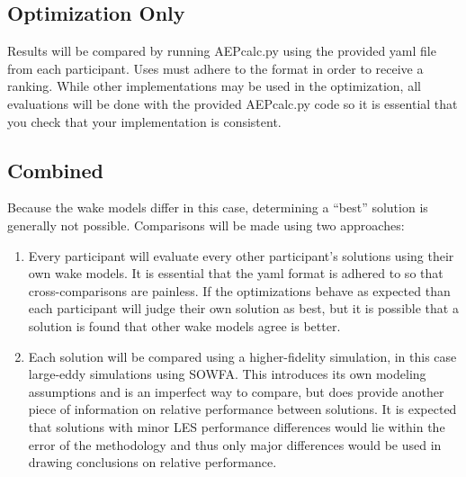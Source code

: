 \documentclass{article}
\begin{document}
\subsection{Optimization Only}

Results will be compared by running AEPcalc.py using the provided yaml file from each participant.  Uses must adhere to the format in order to receive a ranking.  While other implementations may be used in the optimization, all evaluations will be done with the provided AEPcalc.py code so it is essential that you check that your implementation is consistent.

\subsection{Combined}

Because the wake models differ in this case, determining a ``best'' solution is generally not possible.  Comparisons will be made using two approaches:
\begin{enumerate}
    \item Every participant will evaluate every other participant's solutions using their own wake models.  It is essential that the yaml format is adhered to so that cross-comparisons are painless.  If the optimizations behave as expected than each participant will judge their own solution as best, but it is possible that a solution is found that other wake models agree is better.
    \item Each solution will be compared using a higher-fidelity simulation, in this case large-eddy simulations using SOWFA.  This introduces its own modeling assumptions and is an imperfect way to compare, but does provide another piece of information on relative performance between solutions.  It is expected that solutions with minor LES performance differences would lie within the error of the methodology and thus only major differences would be used in drawing conclusions on relative performance.
\end{enumerate}




\end{document}
